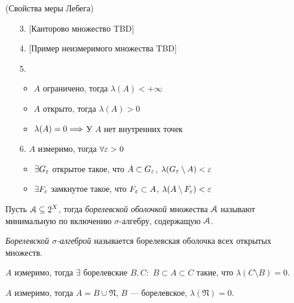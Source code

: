 \begin{theorem}(Свойства меры Лебега)
    \begin{itemize}
        \item[3.] [Канторово множество TBD]
        \item[4.] [Пример неизмеримого множества TBD]
        \item[5.] \begin{itemize}
                    \item $A$ ограничено, тогда $\lambda(A) < +\infty$
                    \item $A$ открыто, тогда $\lambda(A) > 0$
                    \item $\lambda(A) = 0 \Longrightarrow$ У $A$ нет внутренних точек
                  \end{itemize}
        \item[6.] $A$ измеримо, тогда $\forall \varepsilon > 0$
                \begin{itemize}
                    \item $\exists G_{\varepsilon}$ открытое такое, что
                    $A \subset G_{\varepsilon}$, $\lambda(G_{\varepsilon} \setminus A) < \varepsilon$
                    \item $\exists F_{\varepsilon}$ замкнутое такое, что
                    $F_{\varepsilon} \subset A$, $\lambda(A \setminus F_{\varepsilon}) < \varepsilon$
                \end{itemize}
    \end{itemize}
\end{theorem}

\begin{definition}
    Пусть $\mathcal{A} \subseteq 2^X$, тогда \textit{борелевской оболочкой} множества $\mathcal{A}$
    называют минимальную по включению $\sigma$-алгебру, содержащую $\mathcal{A}$.
\end{definition}

\begin{definition}
    \textit{Борелевской $\sigma$-алгеброй} называется борелевская оболочка
    всех открытых множеств.
\end{definition}

\begin{corollary}
    $A$ измеримо, тогда $\exists$ борелевские $B, C\colon$ $B \subset A \subset C$
    такие, что $\lambda(C \setminus B) = 0$.
\end{corollary}

\begin{corollary}
    $A$ измеримо, тогда $A = B \cup \mathfrak{N}$, $B$ --- борелевское,
    $\lambda(\mathfrak{N}) = 0$.
\end{corollary}

